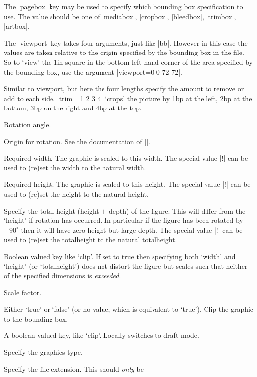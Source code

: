 \begin{description}
The |pagebox| key may be used to specify which bounding box specification to use.
The value should be one of
|mediabox|, |cropbox|, |bleedbox|, |trimbox|, |artbox|.
\item[viewport]
 The |viewport| key takes four arguments, just like
 |bb|. However in this case the values are taken relative to the
 origin specified by the bounding box in the file. So to `view' the
 1in square in the bottom left hand corner of the area specified by
 the bounding box, use the argument |viewport=0 0 72 72|.
\item[trim]
 Similar to viewport, but here the four lengths specify the
 amount to remove or add to each side. |trim= 1 2 3 4| `crops' the
 picture by 1bp at the left, 2bp at the bottom, 3bp on the right and
 4bp at the top.
\item[angle] Rotation angle.
\item[origin]
 Origin for rotation. See the documentation of |\rotatebox|.
\item[width] Required width. The
  graphic is scaled to this width. The special value |!| can be used
  to (re)set the width to the natural width.
\item[height] Required height. The
  graphic is scaled to this height. The special value |!| can be used
  to (re)set the height to the natural height.
\item[totalheight]
 Specify the total height (height $+$ depth) of the figure.
 This will differ from the `height' if rotation has occurred.
 In particular if the figure has been rotated by $-90^\circ$
 then it will have zero height but large depth. The special value |!| can be used
  to (re)set the totalheight to the natural totalheight.
\item[keepaspectratio]
 Boolean valued key like `clip'.
 If set to true then specifying both `width' and `height' (or
 `totalheight') does not distort the figure but scales such that
  neither of the specified dimensions is \emph{exceeded}.
\item[scale] Scale factor.
\item[clip] Either `true' or `false' (or no value, which is equivalent
  to `true'). Clip the graphic to the bounding box.
\item[draft] A boolean valued key, like `clip'. Locally switches to
  draft mode.
\item[type] Specify the graphics type.
\item[ext]  Specify the file extension. This should \emph{only} be

\end{description}
